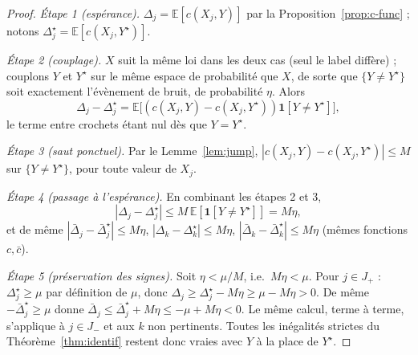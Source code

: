 \documentclass[12pt,a4paper]{article}
\theoremstyle{remark}
\begin{document}
\begin{proof}
\emph{Étape 1 (espérance).} $\Delta_j=\mathbb E[c(X_j,Y)]$ par la
Proposition~\ref{prop:c-func} ; notons $\Delta_j^\star=\mathbb E[c(X_j,Y^\star)]$.

\emph{Étape 2 (couplage).} $X$ suit la même loi dans les deux cas (seul le
label diffère) ; couplons $Y$ et $Y^\star$ sur le même espace de
probabilité que $X$, de sorte que $\{Y\ne Y^\star\}$ soit exactement
l'évènement de bruit, de probabilité $\eta$. Alors
\[
  \Delta_j - \Delta_j^\star = \mathbb E\bigl[(c(X_j,Y)-c(X_j,Y^\star))\mathbf 1[Y\ne Y^\star]\bigr],
\]
le terme entre crochets étant nul dès que $Y=Y^\star$.

\emph{Étape 3 (saut ponctuel).} Par le Lemme~\ref{lem:jump},
$|c(X_j,Y)-c(X_j,Y^\star)|\le M$ sur $\{Y\ne Y^\star\}$, pour toute valeur de $X_j$.

\emph{Étape 4 (passage à l'espérance).} En combinant les étapes 2 et 3,
\[
  |\Delta_j-\Delta_j^\star| \le M\,\mathbb E[\mathbf 1[Y\ne Y^\star]] = M\eta,
\]
et de même $|\bar\Delta_j-\bar\Delta_j^\star|\le M\eta$, $|\Delta_k-\Delta_k^\star|\le M\eta$,
$|\bar\Delta_k-\bar\Delta_k^\star|\le M\eta$ (mêmes fonctions $c,\bar c$).

\emph{Étape 5 (préservation des signes).} Soit $\eta<\mu/M$, i.e.\ $M\eta<\mu$.
Pour $j\in J_+$ : $\Delta_j^\star\ge\mu$ par définition de $\mu$, donc
$\Delta_j\ge\Delta_j^\star-M\eta\ge\mu-M\eta>0$. De même
$-\bar\Delta_j^\star\ge\mu$ donne $\bar\Delta_j\le\bar\Delta_j^\star+M\eta\le-\mu+M\eta<0$.
Le même calcul, terme à terme, s'applique à $j\in J_-$ et aux $k$ non
pertinents. Toutes les inégalités strictes du Théorème~\ref{thm:identif}
restent donc vraies avec $Y$ à la place de $Y^\star$.
\end{proof}
\end{document}
